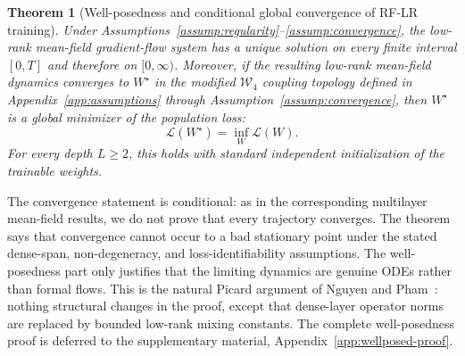 \documentclass{article}
\newtheorem{theorem}{Theorem}[section]
\newcommand{\scrL}{\mathcal{L}}
\begin{document}
\begin{theorem}[Well-posedness and conditional global convergence of RF-LR training]
\label{thm:convergence}
Under Assumptions~\ref{assump:regularity}--\ref{assump:convergence}, the low-rank mean-field gradient-flow system has a unique solution on every finite interval $[0,T]$ and therefore on $[0,\infty)$. Moreover, if the resulting low-rank mean-field dynamics converges to $W^\star$ in the modified $\mathcal W_4$ coupling topology defined in Appendix~\ref{app:assumptions} through Assumption~\ref{assump:convergence}, then $W^\star$ is a global minimizer of the population loss:
\begin{equation}
\scrL(W^\star)=\inf_W \scrL(W).
\end{equation}
For every depth $L\ge2$, this holds with standard independent initialization of the trainable weights.
\end{theorem}

The convergence statement is conditional: as in the corresponding multilayer mean-field results, we do not prove that every trajectory converges. The theorem says that convergence cannot occur to a bad stationary point under the stated dense-span, non-degeneracy, and loss-identifiability assumptions. The well-posedness part only justifies that the limiting dynamics are genuine ODEs rather than formal flows. This is the natural Picard argument of Nguyen and Pham~\cite{nguyen2023}: nothing structural changes in the proof, except that dense-layer operator norms are replaced by bounded low-rank mixing constants. The complete well-posedness proof is deferred to the supplementary material, Appendix~\ref{app:wellposed-proof}.
\end{document}
